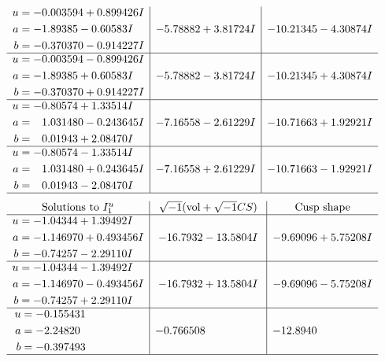 \documentclass[1p]{elsarticle_modified}
\theoremstyle{definition}
\newcommand{\I}{\sqrt{-1}}
\begin{document}
$$\begin{array}{c|c|c}
\begin{aligned}
u &= -0.003594 + 0.899426 I \\
a &= -1.89385 - 0.60583 I \\
b &= -0.370370 - 0.914227 I\end{aligned}
 & -5.78882 + 3.81724 I & -10.21345 - 4.30874 I \\ \hline\begin{aligned}
u &= -0.003594 - 0.899426 I \\
a &= -1.89385 + 0.60583 I \\
b &= -0.370370 + 0.914227 I\end{aligned}
 & -5.78882 - 3.81724 I & -10.21345 + 4.30874 I \\ \hline\begin{aligned}
u &= -0.80574 + 1.33514 I \\
a &= \phantom{-}1.031480 - 0.243645 I \\
b &= \phantom{-}0.01943 + 2.08470 I\end{aligned}
 & -7.16558 - 2.61229 I & -10.71663 + 1.92921 I \\ \hline\begin{aligned}
u &= -0.80574 - 1.33514 I \\
a &= \phantom{-}1.031480 + 0.243645 I \\
b &= \phantom{-}0.01943 - 2.08470 I\end{aligned}
 & -7.16558 + 2.61229 I & -10.71663 - 1.92921 I\\
 \hline 
 \end{array}$$\newpage$$\begin{array}{c|c|c}  
\text{Solutions to }I^u_{1}& \I (\text{vol} + \sqrt{-1}CS) & \text{Cusp shape}\\
 \hline 
\begin{aligned}
u &= -1.04344 + 1.39492 I \\
a &= -1.146970 + 0.493456 I \\
b &= -0.74257 - 2.29110 I\end{aligned}
 & -16.7932 - 13.5804 I & -9.69096 + 5.75208 I \\ \hline\begin{aligned}
u &= -1.04344 - 1.39492 I \\
a &= -1.146970 - 0.493456 I \\
b &= -0.74257 + 2.29110 I\end{aligned}
 & -16.7932 + 13.5804 I & -9.69096 - 5.75208 I \\ \hline\begin{aligned}
u &= -0.155431\phantom{ +0.000000I} \\
a &= -2.24820\phantom{ +0.000000I} \\
b &= -0.397493\phantom{ +0.000000I}\end{aligned}
 & -0.766508\phantom{ +0.000000I} & -12.8940\phantom{ +0.000000I}\\
 \hline 
 \end{array}$$\newpage\newpage\renewcommand{\arraystretch}{1}
\end{document}
